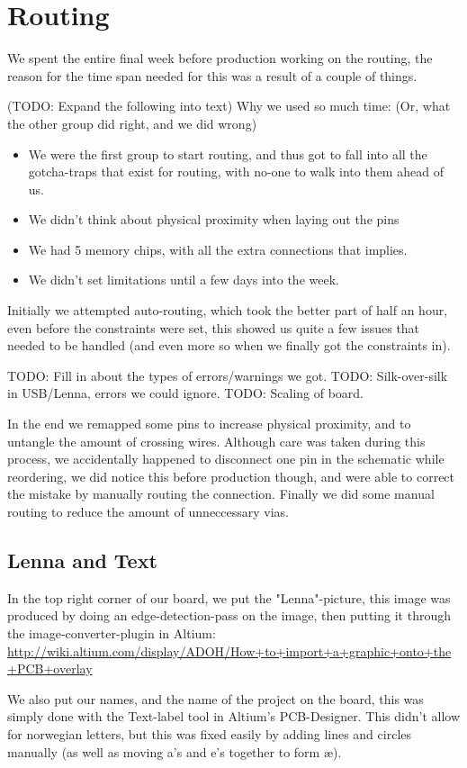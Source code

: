 \section {Routing}

We spent the entire final week before production working on the routing,
the reason for the time span needed for this was a result of a couple of
things.

(TODO: Expand the following into text)
Why we used so much time: (Or, what the other group did right, and we did wrong)
\begin {itemize}
\item We were the first group to start routing, and thus got to fall into all the gotcha-traps that
exist for routing, with no-one to walk into them ahead of us.
\item We didn't think about physical proximity when laying out the pins
\item We had 5 memory chips, with all the extra connections that implies.
\item We didn't set limitations until a few days into the week.
\end {itemize}

Initially we attempted auto-routing, which took the better part of half an hour,
even before the constraints were set, this showed us quite a few issues that needed
to be handled (and even more so when we finally got the constraints in).

TODO: Fill in about the types of errors/warnings we got.
TODO: Silk-over-silk in USB/Lenna, errors we could ignore.
TODO: Scaling of board.

In the end we remapped some pins to increase physical proximity, and to untangle the
amount of crossing wires. Although care was taken during this process, we accidentally
happened to disconnect one pin in the schematic while reordering, we did notice this before
production though, and were able to correct the mistake by manually routing the connection.
Finally we did some manual routing to reduce the amount of unneccessary vias. \\

\subsection {Lenna and Text}
In the top right corner of our board, we put the "Lenna"-picture, this image
was produced by doing an edge-detection-pass on the image, then putting it through
the image-converter-plugin in Altium: \url{http://wiki.altium.com/display/ADOH/How+to+import+a+graphic+onto+the+PCB+overlay}

We also put our names, and the name of the project on the board, this was simply done
with the Text-label tool in Altium's PCB-Designer. This didn't allow for norwegian letters,
but this was fixed easily by adding lines and circles manually (as well as moving a's and e's together
to form æ).
